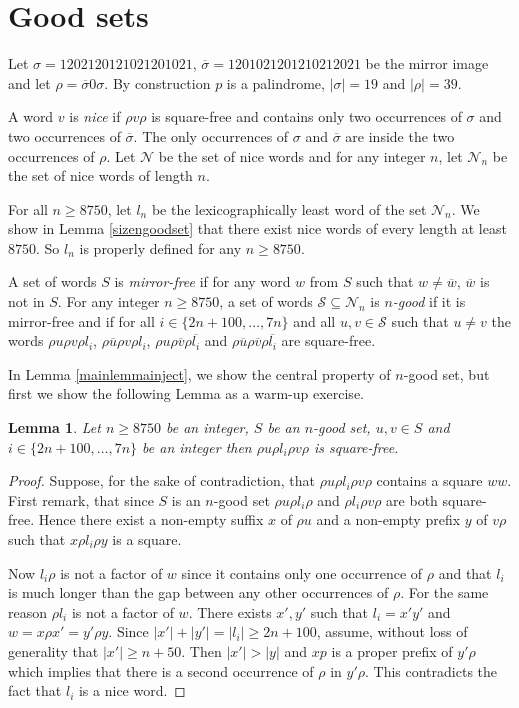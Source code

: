 \documentclass[a4paper,12pt]{article}
\newtheorem{lemma}{Lemma}
\newcommand{\pal}{\rho}
\newcommand{\hpal}{\sigma}
\begin{document}
\section{Good sets}\label{seccow}
 
Let $\hpal=1202120121021201021$, $\overline \hpal=1201021201210212021$ be the mirror image and let $\pal=\overline \hpal 0 \hpal$. By construction $p$ is a palindrome, $|\hpal|=19$ and $|\pal|=39$.

A word $v$  is \emph{nice} if $\pal v\pal$ is square-free and contains only two occurrences of $\hpal$ and two occurrences of $\overline{\hpal}$.
The only occurrences of $\hpal$ and $\overline \hpal$ are inside the two occurrences of $\pal$. Let $\mathcal{N}$ be the set of nice words and for any integer $n$, let $\mathcal{N}_n$ be the set of nice words of length $n$.



For all $n\ge 8750$, let $l_n$ be the lexicographically least word of the set $\mathcal{N}_n$. We show in Lemma \ref{sizengoodset} that there exist nice words of every length at least $8750$. So $l_n$ is properly defined for any $n\ge 8750$.

A set of words $S$ is \emph{mirror-free} if for any word $w$ from $S$ such that $w\not=\overline w$,  $\overline w$ is not in $S$. For any integer $n\ge 8750$, a set of words $\mathcal{S}\subseteq\mathcal{N}_n$ is \emph{$n$-good} if it is mirror-free and if
for all $i\in\{2n+100,\ldots,7n\}$ and all $u,v\in \mathcal{S}$ such that $u\not=v$  the words $\pal u\pal v\pal l_i$, $\pal\overline u\pal v\pal l_i$, $\pal u\pal \overline v\pal \overline{l_i}$ and $\pal\overline u\pal\overline v\pal\overline{l_i}$ are square-free.

In Lemma \ref{mainlemmainject}, we show the central property of $n$-good set, but first we show the following Lemma as a warm-up exercise.

\begin{lemma}\label{warmup}
Let $n\ge 8750$ be an integer, $S$ be an $n$-good set, $u,v\in S$ and $i\in \{2n+100,\ldots, 7n\}$ be an integer then $\pal u\pal l_i\pal v\pal$ is square-free.
\end{lemma}
\begin{proof}
Suppose, for the sake of contradiction, that $\pal u\pal l_i\pal v\pal$ contains a square $ww$.
First remark, that since $S$ is an $n$-good set $\pal u\pal l_i\pal$ and
$\pal l_i\pal v\pal$ are both square-free.
Hence there exist a non-empty suffix $x$ of $\pal u$ and a non-empty prefix $y$ of $v\pal$ such that $x\pal l_i\pal y$ is a square.

Now $l_i\pal$ is not a factor of $w$ since it contains only one occurrence of $\pal$ and that $l_i$ is much longer than the gap between any other occurrences of $\pal$. For the same reason $\pal l_i$ is not a factor of $w$.
There exists $x',y'$ such that $l_i=x'y'$ and $w=x\pal x'=y'\pal y$.
Since $|x'|+|y'|=|l_i|\ge 2n+100$, assume, without loss of generality that $|x'|\ge n+50$.
Then $|x'|> | y|$ and $xp$ is a proper prefix of $y'\pal$ which implies that there is a second occurrence of $\pal$ in $y'\pal$. This contradicts the fact that $l_i$ is a nice word. 
\end{proof}
\end{document}
